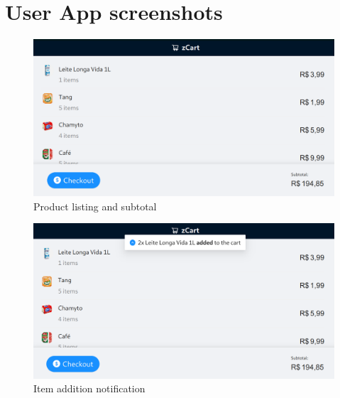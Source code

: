 \documentclass[openright]{normas-utf-tex} %
\begin{document}
\clearpage
\label{bibstart}

\label{bibend}

\apendice
\chapter{User App screenshots}
\label{ap:userapp}

\begin{figure}[H]
	\centering
	\includegraphics[width=1\textwidth]{./images/userapp.png}
	\caption[]{Product listing and subtotal}
\end{figure}

\begin{figure}[H]
	\centering
	\includegraphics[width=1\textwidth]{./images/userapp2.png}
	\caption[]{Item addition notification}
\end{figure}
\end{document}
